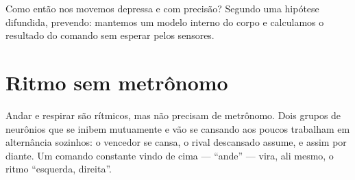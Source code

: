 Como então nos movemos depressa e com precisão? Segundo uma hipótese difundida, prevendo: mantemos um modelo interno do corpo e calculamos o resultado do comando sem esperar pelos sensores.

\section*{Ritmo sem metrônomo}

Andar e respirar são rítmicos, mas não precisam de metrônomo. Dois grupos de neurônios que se inibem mutuamente e vão se cansando aos poucos trabalham em alternância sozinhos: o vencedor se cansa, o rival descansado assume, e assim por diante. Um comando constante vindo de cima --- ``ande'' --- vira, ali mesmo, o ritmo ``esquerda, direita''.

